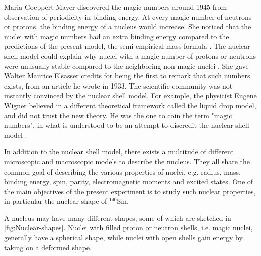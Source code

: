 \documentclass[twoside,english]{uiofysmaster/uiofysmaster}
\newcommand{\Sm}{$^{140}$Sm} %
\let\orgautoref\autoref
\renewcommand{\autoref}
        {%
		 \def\sectionautorefname{Section}%
		 \def\subsectionautorefname{Section}%
		 \def\subsubsectionautorefname{Section}%
		 \def\chapterautorefname{Chapter}%
          \orgautoref}
\begin{document}
Maria Goeppert Mayer discovered the magic numbers around 1945 from observation of periodicity in binding energy. 
At every magic number of neutrons or protons, the binding energy of a nucleus would increase. 
She noticed that the nuclei with magic numbers had an extra binding energy compared to the predictions of the present model, the semi-empirical mass formula \cite{NR}. 
The nuclear shell model could explain why nuclei with a magic number of protons or neutrons were unusually stable compared to the neighboring non-magic nuclei \cite{Mayer1964}. 
She gave Walter Maurice Elsasser credits for being the first to remark that such numbers exists, from an article he wrote in 1933. 
The scientific community was not instantly convinced by the nuclear shell model.
For example, the physicist Eugene Wigner believed in a different theoretical framework called the liquid drop model, and did not trust the new theory. 
He was the one to coin the term "magic numbers", in what is understood to be an attempt to discredit the nuclear shell model \cite{Mayer1964, MIT-OCW}.

In addition to the nuclear shell model, there exists a multitude of different microscopic and macroscopic models to describe the nucleus. 
They all share the common goal of describing the various properties of nuclei, e.g. radius, mass, binding energy, spin, parity, electromagnetic moments and excited states.
One of the main objectives of the present experiment is to study such nuclear properties, in particular the nuclear shape of \Sm. 



A nucleus may have many different shapes, some of which are sketched in \autoref{fig:Nuclear-shapes}.
Nuclei with filled proton or neutron shells, i.e. magic nuclei, generally have a spherical shape, while nuclei with open shells gain energy by taking on a deformed shape.
\end{document}
